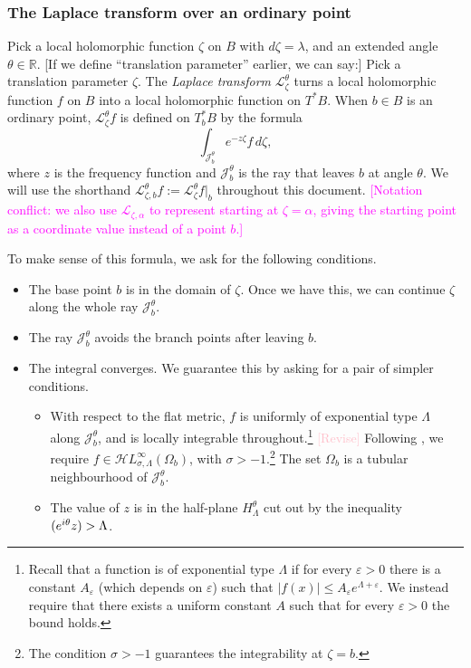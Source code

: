 \documentclass{article}
\let\Re\relax
\DeclareMathOperator{\Re}{Re}
\newcommand{\singexp}[2]{\mathcal{H}L^\infty_{#1, #2}}
\newcommand{\R}{\mathbb{R}}
\newcommand{\laplace}{\mathcal{L}}
\theoremstyle{definition}
\theoremstyle{plain}
\begin{document}
\subsubsection{The Laplace transform over an ordinary point}\label{laplace:ordinary}
Pick a local holomorphic function $\zeta$ on $B$ with $d\zeta = \lambda$, and an extended angle $\theta \in \R$. \textcolor{VioletRed}{[If we define ``translation parameter'' earlier, we can say:] Pick a translation parameter $\zeta$.} The {\em Laplace transform} $\laplace_\zeta^\theta$ turns a local holomorphic function $f$ on $B$ into a local holomorphic function on $T^*B$. When $b \in B$ is an ordinary point, $\laplace_\zeta^\theta f$ is defined on $T_b^*B$ by the formula
\begin{equation}\label{laplace:int}
\int_{\mathcal{J}_{b}^\theta} e^{-z\zeta} f\,d\zeta,
\end{equation}
where $z$ is the frequency function and $\mathcal{J}_{b}^\theta$ is the ray that leaves $b$ at angle $\theta$. We will use the shorthand $\laplace_{\zeta, b}^\theta f := \laplace_\zeta^\theta f \big|_b$ throughout this document. \textcolor{magenta}{[Notation conflict: we also use $\laplace_{\zeta, \alpha}$ to represent starting at $\zeta = \alpha$, giving the starting point as a coordinate value instead of a point $b$.]}

To make sense of this formula, we ask for the following conditions.
\begin{itemize}
\item The base point $b$ is in the domain of $\zeta$. Once we have this, we can continue $\zeta$ along the whole ray $\mathcal{J}_b^\theta$.
\item The ray $\mathcal{J}_b^\theta$ avoids the branch points after leaving $b$.
\item The integral converges. We guarantee this by asking for a pair of simpler conditions.
\begin{itemize}
\item With respect to the flat metric, $f$ is uniformly of exponential type $\Lambda$ along $\mathcal{J}_b^\theta$, and is locally integrable throughout.\footnote{Recall that a function is of exponential type $\Lambda$ if for every $\varepsilon>0$ there is a constant $A_\varepsilon$ (which depends on $\varepsilon$) such that $|f(x)|\leq A_\varepsilon e^{\Lambda+\varepsilon} $. We instead require that there exists a uniform constant $A$ such that for every $\varepsilon>0$ the bound holds.} \textcolor{Pink}{[Revise]} Following \cite{reg-sing-volterra}, we require $f \in \singexp{\sigma}{\Lambda}(\Omega_b)$, with $\sigma>-1$.\footnote{The condition $\sigma>-1$ guarantees the integrability at $\zeta=b$.} The set $\Omega_b$ is a tubular neighbourhood of $\mathcal{J}_b^\theta$. 
\item The value of $z$ is in the half-plane $H^{\theta}_\Lambda$ cut out by the inequality $\Re(e^{i\theta} z) > \Lambda$.
\end{itemize}
\end{itemize}
\color{black}
\end{document}
